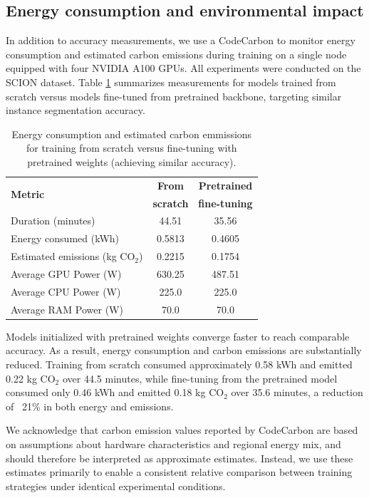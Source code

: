 \documentclass[review,authoryear]{elsarticle}
\begin{document}
\subsection{Energy consumption and environmental impact}

In addition to accuracy measurements, we use a CodeCarbon \citep{benoit_courty_2024_11171501} to monitor energy consumption and estimated carbon emissions during training on a single node equipped with four NVIDIA A100 GPUs. All experiments were conducted on the SCION dataset. Table \ref{tab:energy_comparison} summarizes measurements for models trained from scratch versus models fine-tuned from pretrained backbone, targeting similar instance segmentation accuracy.

\begin{table}[h!]
\centering
\caption{Energy consumption and estimated carbon emmissions for training from scratch versus fine-tuning with pretrained weights (achieving similar accuracy).}
\begin{tabular}{lcc}
    \hline
    \multirow{2}{*}{\textbf{Metric}} & \textbf{From} & \textbf{Pretrained} \\
     & \textbf{scratch} & \textbf{fine-tuning} \\
    \hline
    Duration (minutes) & 44.51 & 35.56 \\
    Energy consumed (kWh) & 0.5813 & 0.4605 \\
    Estimated emissions (kg CO$_2$) & 0.2215 & 0.1754 \\
    Average GPU Power (W) & 630.25 & 487.51 \\
    Average CPU Power (W) & 225.0 & 225.0 \\
    Average RAM Power (W) & 70.0 & 70.0 \\
\hline
\end{tabular}
\label{tab:energy_comparison}
\end{table}

Models initialized with pretrained weights converge faster to reach comparable accuracy. As a result, energy consumption and carbon emissions are substantially reduced. Training from scratch consumed approximately 0.58 kWh and emitted 0.22 kg CO$_2$ over 44.5 minutes, while fine-tuning from the pretrained model consumed only 0.46 kWh and emitted 0.18 kg CO$_2$ over 35.6 minutes, a reduction of ~21\% in both energy and emissions. 

We acknowledge that carbon emission values reported by CodeCarbon are based on assumptions about hardware characteristics and regional energy mix, and should therefore be interpreted as approximate estimates. Instead, we use these estimates primarily to enable a consistent relative comparison between training strategies under identical experimental conditions. 
\end{document}
